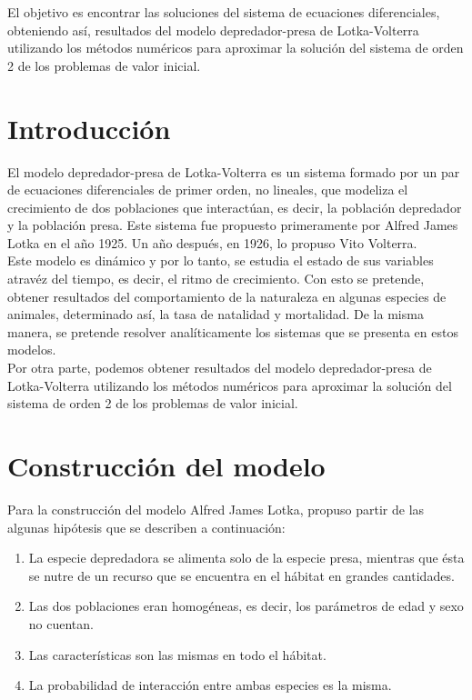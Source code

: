 \documentclass[10pt,letterpaper]{article}
\begin{document}
El objetivo es encontrar las soluciones del sistema de ecuaciones diferenciales, obteniendo así, resultados del modelo depredador-presa de Lotka-Volterra utilizando los métodos numéricos para aproximar la solución del sistema de orden 2 de los problemas de valor inicial.


\section{Introducción}
El modelo depredador-presa de Lotka-Volterra es un sistema formado por un par de ecuaciones diferenciales de primer orden, no lineales, que modeliza el crecimiento de dos poblaciones que interactúan, es decir, la población depredador y la población presa. Este sistema fue propuesto primeramente por Alfred James Lotka en el año 1925. Un año después, en 1926, lo propuso Vito Volterra.\\

Este modelo es dinámico y por lo tanto, se estudia el estado de sus variables atravéz del tiempo, es decir, el ritmo de crecimiento. Con esto se pretende, obtener resultados del comportamiento de la naturaleza en algunas especies de animales, determinado así, la tasa de natalidad y mortalidad. De la misma manera, se pretende resolver analíticamente los sistemas que se presenta en estos modelos.\\

Por otra parte, podemos obtener resultados del modelo depredador-presa de Lotka-Volterra utilizando los métodos numéricos para aproximar la solución del sistema de orden 2 de los problemas de valor inicial.
  

\section[Construcción]{Construcción del modelo}
Para la construcción del modelo Alfred James Lotka, propuso partir de las algunas hipótesis que se describen a continuación:
\begin{enumerate}
\item La especie depredadora se alimenta solo de la especie presa, mientras que ésta se nutre de un recurso que se encuentra en el hábitat en grandes cantidades.
	
\item Las dos poblaciones eran homogéneas, es decir, los parámetros de edad y sexo no cuentan.

\item Las características son las mismas en todo el hábitat.

\item La probabilidad de interacción entre ambas especies es la misma.
\end{enumerate}
\end{document}
